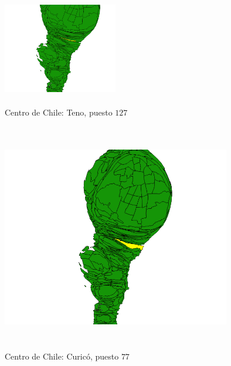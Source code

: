 \documentclass[20pt]{report}
\begin{document}
\begin{itemize}
\begin{figure}[H]
\begin{center}
\includegraphics[width=5cm, height=5cm]{teno129.png}
\vspace{-0.5cm} %
\caption{Centro de Chile: Teno, puesto $127$}
\label{Label para referencia}
\end{center}
\end{figure}

\begin{figure}[H]
\begin{center}
\includegraphics[width=10cm, height=10cm]{curico79.png}
\vspace{-0.5cm} %
\caption{Centro de Chile: Curic\'o, puesto $77$}
\label{Label para referencia}
\end{center}
\end{figure}




\end{itemize}
\end{document}
